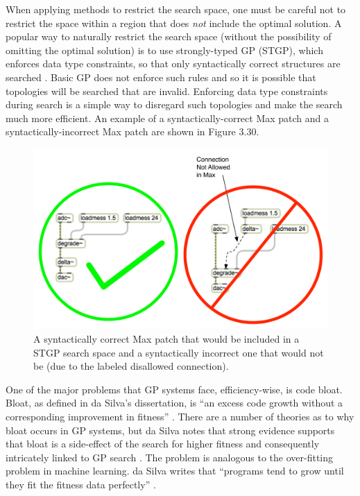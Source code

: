 \documentclass[a4paper,12pt]{report} 	%
\numberwithin{figure}{chapter}
\numberwithin{table}{chapter}
\numberwithin{equation}{chapter}
\begin{document}
\begin{flushleft}
When applying methods to restrict the search space, one must be careful not to restrict the space within a region that does \emph{not} include the optimal solution. A popular way to naturally restrict the search space (without the possibility of omitting the optimal solution) is to use strongly-typed GP (STGP), which enforces data type constraints, so that only syntactically correct structures are searched  \cite{Vanneschi:2004le, Harris:1997qf, Pachet:2007if}. Basic GP does not enforce such rules and so it is possible that topologies will be searched that are invalid. Enforcing data type constraints during search is a simple way to disregard such topologies and make the search much more efficient. An example of a syntactically-correct Max patch and a syntactically-incorrect Max patch are shown in Figure 3.30.
\\
\begin{figure}[h!]
\begin{center}
\includegraphics[scale=0.70]{SyntacticCorrectness}
\caption[Strongly-Typed Genetic Programming]{A syntactically correct Max patch that would be included in a STGP search space and a syntactically incorrect one that would not be (due to the labeled disallowed connection).}
\end{center}
\end{figure}
One of the major problems that GP systems face, efficiency-wise, is code bloat. Bloat, as defined in da Silva's dissertation, is ``an excess code growth without a corresponding improvement in fitness'' \cite[p. 2]{Silva:2008le}. There are a number of theories as to why bloat occurs in GP systems, but da Silva notes that strong evidence supports that bloat is a side-effect of the search for higher fitness and consequently intricately linked to GP search \cite[p. 9]{Silva:2008le}. The problem is analogous to the over-fitting problem in machine learning. da Silva writes that ``programs tend to grow until they fit the fitness data perfectly'' \cite[p. 9]{Silva:2008le}.


\end{flushleft}
\end{document}
